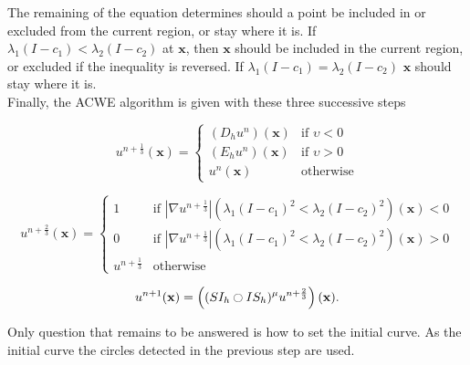 The remaining of the equation determines should a point be included in or excluded from the current region, or stay where it is. If $\lambda_1(I - c_1) < \lambda_2 (I - c_2) $ at $\mathbf{x}$, then $\mathbf{x}$ should be included in the current region, or excluded if the inequality is reversed. If $\lambda_1(I - c_1) = \lambda_2 (I - c_2) $ $\mathbf{x}$ should stay where it is. \\

Finally, the ACWE algorithm is given with these three successive steps

\begin{equation}
	u^{n + \frac{1}{3}}(\mathbf{x}) = 
	\begin{cases}
		(D_hu^n)(\mathbf{x}) & \text{if } \upsilon < 0 \\
		(E_hu^n)(\mathbf{x}) & \text{if } \upsilon > 0 \\
		u^n(\mathbf{x}) & \text{otherwise}
	\end{cases}
\end{equation}

\begin{equation}
	u^{n + \frac{2}{3}}(\mathbf{x}) = 
	\begin{cases}
		1 &\text{if } |\nabla u^{n + \frac{1}{3}}|(\lambda_1(I - c_1)^2 < \lambda_2 (I - c_2)^2)(\mathbf{x}) < 0 \\
		0 &\text{if } |\nabla u^{n + \frac{1}{3}}|(\lambda_1(I - c_1)^2 < \lambda_2 (I - c_2)^2)(\mathbf{x}) > 0 \\
		u^{n + \frac{1}{3}} & \text{otherwise}
	\end{cases}
\end{equation}

\begin{equation}
	u^{n + 1}(\mathbf{x}) = \left ( (SI_h \ocircle IS_h)^{\mu} u ^{n + \frac{2}{3}}  \right )(\mathbf{x}).
\end{equation}

Only question that remains to be answered is how to set the initial curve. As the initial curve the circles detected in the previous step are used.